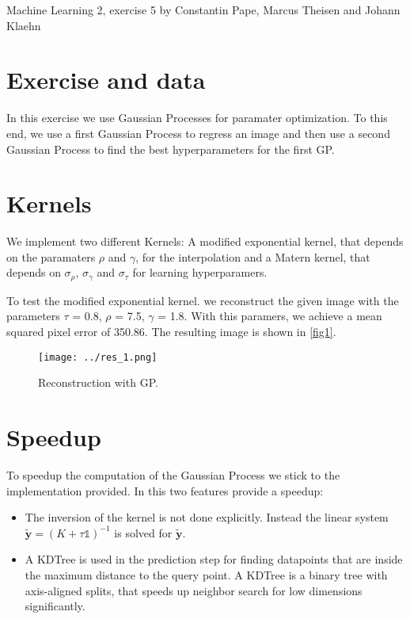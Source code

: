\documentclass{article}
\begin{document}
Machine Learning 2, exercise 5 by Constantin Pape, Marcus Theisen and Johann Klaehn
 
\section{Exercise and data}

In this exercise we use Gaussian Processes for paramater optimization.
To this end, we use a first Gaussian Process to regress an image and then use a second Gaussian Process to find the best hyperparameters for the first GP.

\section{Kernels}

We implement two different Kernels: 
A modified exponential kernel, that depends on the paramaters $\rho$ and $\gamma$, for the 
interpolation and a Matern kernel, that depends on $\sigma_\rho$, $\sigma_\gamma$  and $\sigma_\tau$ for learning hyperparamers.

To test the modified exponential kernel. we reconstruct the given image with the parameters
$\tau$ = 0.8, $\rho$ = 7.5, $\gamma$ = 1.8.
With this paramers, we achieve a mean squared pixel error of 350.86. 
The resulting image is shown in \autoref{fig1}.

\begin{figure}[h]
	\centering
	\texttt{[image: ../res\_1.png]}
	\caption{Reconstruction with GP.}
	\label{fig1}
\end{figure}

\section{Speedup}

To speedup the computation of the Gaussian Process we stick to the implementation provided.
\newline
In this two features provide a speedup:
\begin{itemize}
    \item The inversion of the kernel is not done explicitly. Instead the linear system 
        $\mathbf{\tilde{y}} = (K + \tau \mathbb{1})^{-1}$ is solved for $\mathbf{\tilde{y}}$.
    \item A KDTree is used in the prediction step for finding datapoints that are inside
        the maximum distance to the query point.
        A KDTree is a binary tree with axis-aligned splits, that speeds up neighbor search for 
        low dimensions significantly.
\end{itemize}
\end{document}
